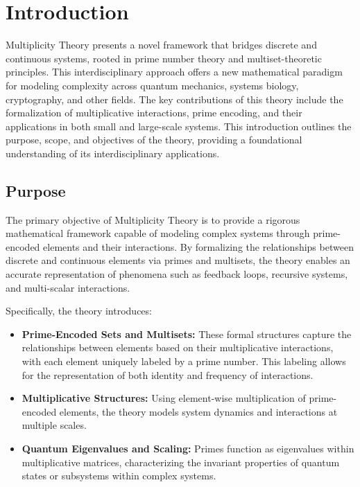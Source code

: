 \documentclass[%
 preprint, linenumbers,
 amsmath,amssymb,
 aps, physrev,
]{revtex4-2}
\begin{document}
\maketitle

\tableofcontents

\section{Introduction}

Multiplicity Theory presents a novel framework that bridges discrete and continuous systems, rooted in prime number theory and multiset-theoretic principles. This interdisciplinary approach offers a new mathematical paradigm for modeling complexity across quantum mechanics, systems biology, cryptography, and other fields. The key contributions of this theory include the formalization of multiplicative interactions, prime encoding, and their applications in both small and large-scale systems. This introduction outlines the purpose, scope, and objectives of the theory, providing a foundational understanding of its interdisciplinary applications.

\subsection{Purpose} The primary objective of Multiplicity Theory is to provide a rigorous mathematical framework capable of modeling complex systems through prime-encoded elements and their interactions. By formalizing the relationships between discrete and continuous elements via primes and multisets, the theory enables an accurate representation of phenomena such as feedback loops, recursive systems, and multi-scalar interactions.

Specifically, the theory introduces:

\begin{itemize} \item \textbf{Prime-Encoded Sets and Multisets:} These formal structures capture the relationships between elements based on their multiplicative interactions, with each element uniquely labeled by a prime number. This labeling allows for the representation of both identity and frequency of interactions. \item \textbf{Multiplicative Structures:} Using element-wise multiplication of prime-encoded elements, the theory models system dynamics and interactions at multiple scales. \item \textbf{Quantum Eigenvalues and Scaling:} Primes function as eigenvalues within multiplicative matrices, characterizing the invariant properties of quantum states or subsystems within complex systems. \end{itemize}
\end{document}
